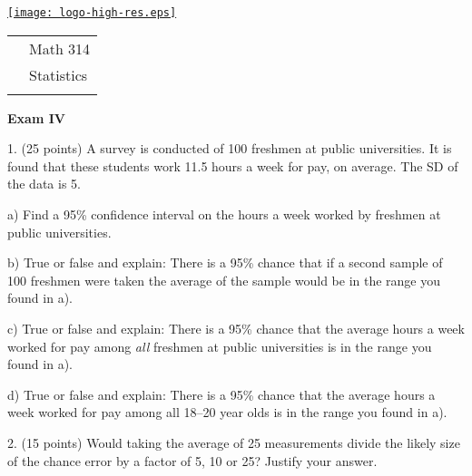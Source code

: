 \documentclass[10pt]{article}
\begin{document}
\pagestyle{empty}
\lstset{language=R, showspaces=false, showstringspaces=false}

\href{http://www.shepherd.edu}{\texttt{[image: logo-high-res.eps]}}
\vspace{-1.69cm}

{\small
\begin{tabular}{cl}
& Math 314\\
& Statistics\\
\hspace{5.28in} & %
\end{tabular}
}
\setlength{\baselineskip}{1.05\baselineskip}

\begin{center}
\textbf{\large  Exam IV}
\end{center}
\medskip

1. (25 points) A survey is conducted of 100 freshmen at public universities.
It is found that these students work 11.5 hours a week for pay, 
on average.  The SD of the data is 5.  

\hspace{20pt} a) Find a 95\% confidence interval
on the  hours  a week worked by freshmen at public universities.
\vspace{2.5in}

\hspace{20pt} b) True or false and explain:  There is a 95\% chance that
if a second sample of 100 freshmen were taken
the average of the sample would be in the range you found in a).
\vspace{1.5in}

\hspace{20pt} c) True or false and explain:  There is a 95\% chance that the
average hours a week worked for pay among \textit{all} freshmen at public universities
is in the range you found in a).
\vspace{1.5in}

\hspace{20pt} d) True or false and explain:  There is a 95\% chance that the
average hours a week worked for pay among all 18--20 year olds
is in the range you found in a).
\vspace{1in}
\vfill
\eject
{\ }



2. (15 points)
Would taking the average of 25 measurements divide the likely size of the chance error by a factor of 5, 10 or 25? Justify your answer.
\vspace{2.5in}
\end{document}
